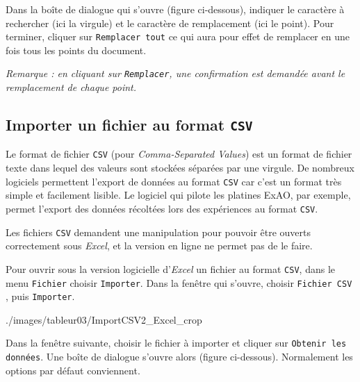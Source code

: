 Dans la boîte de dialogue qui s'ouvre (figure ci-dessous), indiquer le caractère à rechercher  (ici la virgule) et le caractère de remplacement  (ici le point). Pour terminer, cliquer sur \texttt{Remplacer tout}  ce qui aura pour effet de remplacer en une fois tous les points du document.

\emph{Remarque : en cliquant sur \texttt{Remplacer}, une confirmation est demandée avant le remplacement de chaque point.}



\subsection{Importer un fichier au format \texttt{CSV}}\label{Calc3fichierCSV}

Le format de fichier \texttt{CSV} (pour \emph{Comma-Separated Values}) est un format de fichier texte dans lequel des valeurs sont stockées séparées par une virgule. De nombreux logiciels permettent l'export de données au format \texttt{CSV} car c'est un format très simple et facilement lisible. Le logiciel qui pilote les platines ExAO, par exemple, permet l'export des données récoltées lors des expériences au format \texttt{CSV}.

Les fichiers \texttt{CSV} demandent une manipulation pour pouvoir être ouverts correctement sous \emph{Excel}, et la version en ligne ne permet pas de le faire.

\vspace{1em}

Pour ouvrir sous la version logicielle d'\emph{Excel} un fichier au format \texttt{CSV}, dans le menu \texttt{Fichier}  choisir \texttt{Importer}.  Dans la fenêtre qui s'ouvre, choisir \texttt{Fichier CSV} , puis \texttt{Importer}. 

%
{./images/tableur03/ImportCSV2_Excel_crop}{\textwidth}

Dans la fenêtre suivante, choisir le fichier à importer et cliquer sur \texttt{Obtenir les données}. Une boîte de dialogue s'ouvre alors (figure ci-dessous). Normalement les options par défaut conviennent. 


